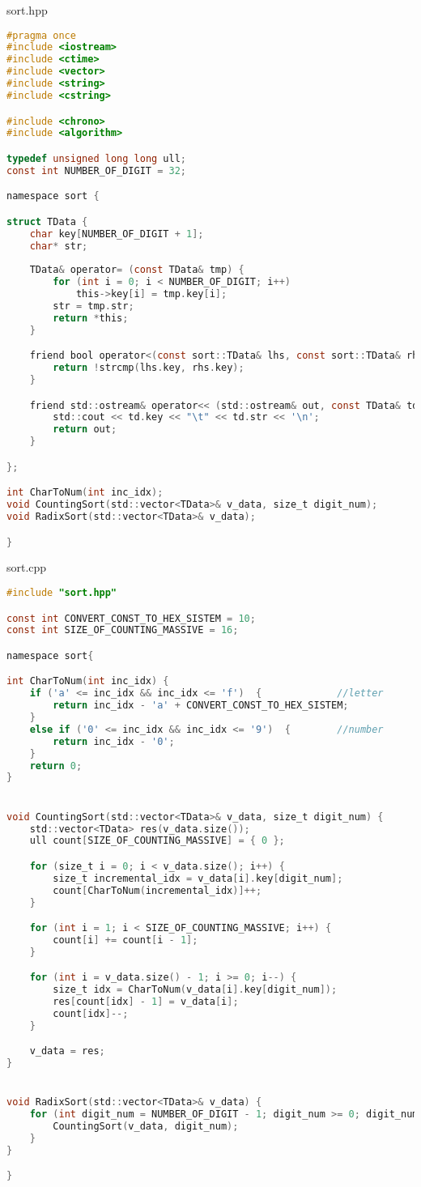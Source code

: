 sort.hpp
\begin{lstlisting}[language=C]
#pragma once
#include <iostream>
#include <ctime>
#include <vector>
#include <string>
#include <cstring>

#include <chrono>
#include <algorithm>

typedef unsigned long long ull;
const int NUMBER_OF_DIGIT = 32;

namespace sort {

struct TData {
    char key[NUMBER_OF_DIGIT + 1];
    char* str;  
    
    TData& operator= (const TData& tmp) {
        for (int i = 0; i < NUMBER_OF_DIGIT; i++)
            this->key[i] = tmp.key[i];
        str = tmp.str;
        return *this;
    }  

    friend bool operator<(const sort::TData& lhs, const sort::TData& rhs){
        return !strcmp(lhs.key, rhs.key);
    }

    friend std::ostream& operator<< (std::ostream& out, const TData& td) {
        std::cout << td.key << "\t" << td.str << '\n';
        return out;
    }

};

int CharToNum(int inc_idx);
void CountingSort(std::vector<TData>& v_data, size_t digit_num);
void RadixSort(std::vector<TData>& v_data);

}
\end{lstlisting}


sort.cpp
\begin{lstlisting}[language=C]
#include "sort.hpp"

const int CONVERT_CONST_TO_HEX_SISTEM = 10;
const int SIZE_OF_COUNTING_MASSIVE = 16;

namespace sort{

int CharToNum(int inc_idx) {
    if ('a' <= inc_idx && inc_idx <= 'f')  {             //letter
        return inc_idx - 'a' + CONVERT_CONST_TO_HEX_SISTEM;
    }
    else if ('0' <= inc_idx && inc_idx <= '9')  {        //number
        return inc_idx - '0';
    }
    return 0;
}


void CountingSort(std::vector<TData>& v_data, size_t digit_num) {
    std::vector<TData> res(v_data.size());
    ull count[SIZE_OF_COUNTING_MASSIVE] = { 0 };

    for (size_t i = 0; i < v_data.size(); i++) {
        size_t incremental_idx = v_data[i].key[digit_num];
        count[CharToNum(incremental_idx)]++;
    }

    for (int i = 1; i < SIZE_OF_COUNTING_MASSIVE; i++) {
        count[i] += count[i - 1];
    }

    for (int i = v_data.size() - 1; i >= 0; i--) {
        size_t idx = CharToNum(v_data[i].key[digit_num]);
        res[count[idx] - 1] = v_data[i];
        count[idx]--;
    }

    v_data = res;
}


void RadixSort(std::vector<TData>& v_data) {
    for (int digit_num = NUMBER_OF_DIGIT - 1; digit_num >= 0; digit_num--) {
        CountingSort(v_data, digit_num);
    }
}

}
\end{lstlisting}

